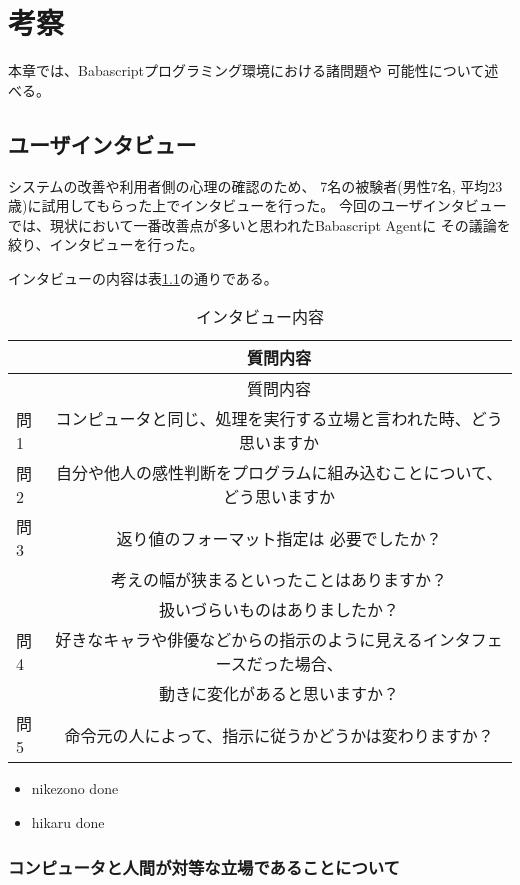 \chapter{考察}\label{chap:discussion}

本章では、Babascriptプログラミング環境における諸問題や
可能性について述べる。

\section{ユーザインタビュー}\label{ux30e6ux30fcux30b6ux30a4ux30f3ux30bfux30d3ux30e5ux30fc}

システムの改善や利用者側の心理の確認のため、 7名の被験者(男性7名,
平均23歳)に試用してもらった上でインタビューを行った。
今回のユーザインタビューでは、現状において一番改善点が多いと思われたBabascript
Agentに その議論を絞り、インタビューを行った。

インタビューの内容は表\ref{table:interview}の通りである。

\begin{longtable}[c]{@{}lc@{}}
\caption{インタビュー内容 \label{table:interview}}\tabularnewline
\toprule
& 質問内容\tabularnewline
\midrule
\endfirsthead
\toprule
& 質問内容\tabularnewline
\midrule
\endhead
問1 &
コンピュータと同じ、処理を実行する立場と言われた時、どう思いますか\tabularnewline
問2 &
自分や他人の感性判断をプログラムに組み込むことについて、どう思いますか\tabularnewline
問3 & 返り値のフォーマット指定は 必要でしたか？ \tabularnewline
& 考えの幅が狭まるといったことはありますか？ \tabularnewline
& 扱いづらいものはありましたか？\tabularnewline
問4 &
好きなキャラや俳優などからの指示のように見えるインタフェースだった場合、\tabularnewline
& 動きに変化があると思いますか？\tabularnewline
問5 &
命令元の人によって、指示に従うかどうかは変わりますか？\tabularnewline
\bottomrule
\end{longtable}

\begin{itemize}
\itemsep1pt\parskip0pt
\item
  nikezono done
\item
  hikaru done
\end{itemize}

\subsection{コンピュータと人間が対等な立場であることについて}\label{ux30b3ux30f3ux30d4ux30e5ux30fcux30bfux3068ux4ebaux9593ux304cux5bfeux7b49ux306aux7acbux5834ux3067ux3042ux308bux3053ux3068ux306bux3064ux3044ux3066}

